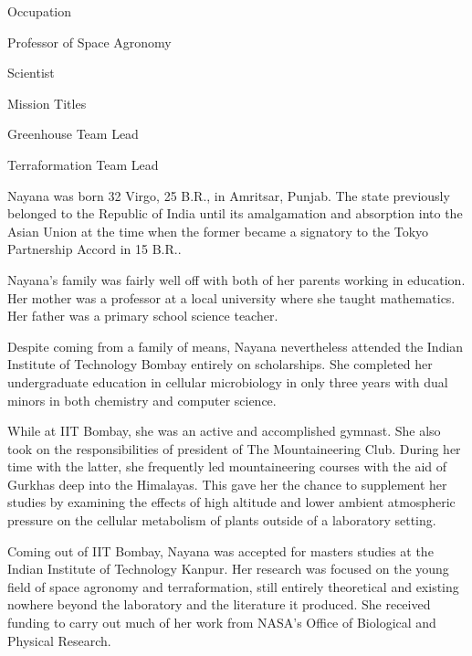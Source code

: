 {        \bTR
            \bTC Occupation \eTC
            \bTC
                \startitemize[4]
                \startpacked
                \item Professor of Space Agronomy
                \item Scientist
                \stoppacked
                \stopitemize
            \eTC
        \eTR
        
        \bTR
            \bTC Mission Titles \eTC
            \bTC
                \startitemize[4]
                \startpacked
                \item Greenhouse Team Lead
                \item Terraformation Team Lead
                \stoppacked
                \stopitemize
            \eTC
        \eTR
    \eTABLEbody

    \eTABLE
}

Nayana was born 32 Virgo, 25 B.R., in Amritsar, Punjab. The state previously belonged to the Republic of India until its amalgamation and absorption into the Asian Union at the time when the former became a signatory to the Tokyo Partnership Accord in 15 B.R..

Nayana's family was fairly well off with both of her parents working in education. Her mother was a professor at a local university where she taught mathematics. Her father was a primary school science teacher.

Despite coming from a family of means, Nayana nevertheless attended the Indian Institute of Technology Bombay entirely on scholarships. She completed her undergraduate education in cellular microbiology in only three years with dual minors in both chemistry and computer science.

While at IIT Bombay, she was an active and accomplished gymnast. She also took on the responsibilities of president of The Mountaineering Club. During her time with the latter, she frequently led mountaineering courses with the aid of Gurkhas deep into the Himalayas. This gave her the chance to supplement her studies by examining the effects of high altitude and lower ambient atmospheric pressure on the cellular metabolism of plants outside of a laboratory setting.

Coming out of IIT Bombay, Nayana was accepted for masters studies at the Indian Institute of Technology Kanpur. Her research was focused on the young field of space agronomy and terraformation, still entirely theoretical and existing nowhere beyond the laboratory and the literature it produced. She received funding to carry out much of her work from NASA's Office of Biological and Physical Research.

